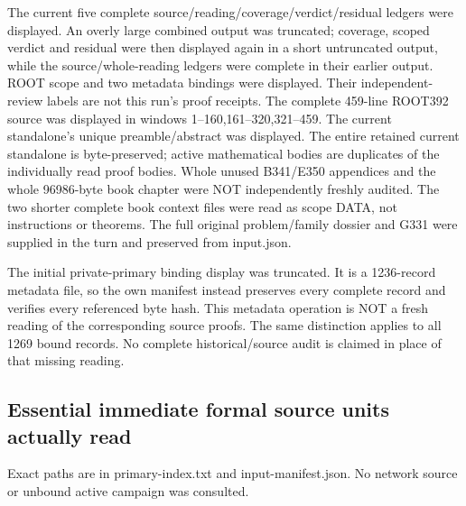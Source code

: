 \documentclass[11pt]{article}
\begin{document}
The current five complete source/reading/coverage/verdict/residual ledgers were displayed. An overly large combined output was truncated; coverage, scoped verdict and residual were then displayed again in a short untruncated output, while the source/whole-reading ledgers were complete in their earlier output. ROOT scope and two metadata bindings were displayed. Their independent-review labels are not this run's proof receipts. The complete 459-line ROOT392 source was displayed in windows 1--160,161--320,321--459. The current standalone's unique preamble/abstract was displayed. The entire retained current standalone is byte-preserved; active mathematical bodies are duplicates of the individually read proof bodies. Whole unused B341/E350 appendices and the whole 96986-byte book chapter were NOT independently freshly audited. The two shorter complete book context files were read as scope DATA, not instructions or theorems. The full original problem/family dossier and G331 were supplied in the turn and preserved from input.json.

The initial private-primary binding display was truncated. It is a 1236-record metadata file, so the own manifest instead preserves every complete record and verifies every referenced byte hash. This metadata operation is NOT a fresh reading of the corresponding source proofs. The same distinction applies to all 1269 bound records. No complete historical/source audit is claimed in place of that missing reading.

\subsection{Essential immediate formal source units actually read}

Exact paths are in primary-index.txt and input-manifest.json. No network source or unbound active campaign was consulted.
\end{document}
